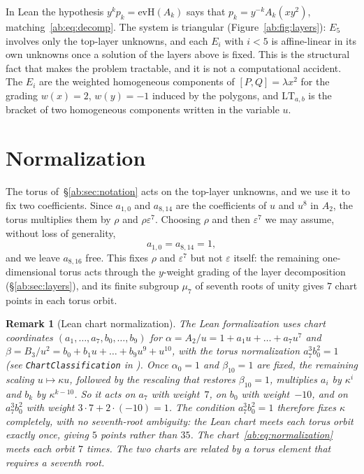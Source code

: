 \documentclass[a4paper,11pt]{article}
\newcommand{\filename}[1]{\texttt{\seqsplit{#1}}}
\theoremstyle{jsplain}
\theoremstyle{jsdef}
\theoremstyle{jsrem}
\newtheorem{remark}[theorem]{Remark}
\begin{document}
In Lean the hypothesis $y^k p_k=\mathrm{evH}(A_k)$ says that $p_k=y^{-k}A_k(xy^2)$, matching~\eqref{ab:eq:decomp}. The system is triangular (Figure~\ref{ab:fig:layers}): $E_5$ involves only the top-layer unknowns, and each $E_i$ with $i<5$ is affine-linear in its own unknowns once a solution of the layers above is fixed. This is the structural fact that makes the problem tractable, and it is not a computational accident. The $E_i$ are the weighted homogeneous components of $[P,Q]=\lambda x^2$ for the grading $w(x)=2$, $w(y)=-1$ induced by the polygons, and $\mathrm{LT}_{a,b}$ is the bracket of two homogeneous components written in the variable $u$.

\section{Normalization}\label{ab:sec:normalization}

The torus of~\S\ref{ab:sec:notation} acts on the top-layer unknowns, and we use it to fix two coefficients. Since $a_{1,0}$ and $a_{8,14}$ are the coefficients of $u$ and $u^8$ in $A_2$, the torus multiplies them by $\rho$ and $\rho\varepsilon^7$. Choosing $\rho$ and then $\varepsilon^7$ we may assume, without loss of generality,
\begin{equation}\label{ab:eq:normalization}
a_{1,0}=a_{8,14}=1,
\end{equation}
and we leave $a_{8,16}$ free. This fixes $\rho$ and $\varepsilon^7$ but not $\varepsilon$ itself: the remaining one-dimensional torus acts through the $y$-weight grading of the layer decomposition (\S\ref{ab:sec:layers}), and its finite subgroup $\mu_7$ of seventh roots of unity gives $7$ chart points in each torus orbit.

\begin{remark}[Lean chart normalization]
The Lean formalization uses chart coordinates $(a_1,\dots,a_7,b_0,\dots,b_9)$ for $\alpha=A_2/u=1+a_1u+\dots+a_7u^7$ and $\beta=B_3/u^2=b_0+b_1u+\dots+b_9u^9+u^{10}$, with the torus normalization $a_7^3 b_0^2 = 1$ (see \texttt{ChartClassification} in \filename{Jacobian/BranchAbChart.lean}). Once $\alpha_0=1$ and $\beta_{10}=1$ are fixed, the remaining scaling $u\mapsto\kappa u$, followed by the rescaling that restores $\beta_{10}=1$, multiplies $a_i$ by $\kappa^i$ and $b_k$ by $\kappa^{k-10}$. So it acts on $a_7$ with weight~$7$, on $b_0$ with weight~$-10$, and on $a_7^3 b_0^2$ with weight $3\cdot7+2\cdot(-10)=1$. The condition $a_7^3 b_0^2 = 1$ therefore fixes $\kappa$ completely, with no seventh-root ambiguity: the Lean chart meets each torus orbit exactly once, giving $5$ points rather than $35$. The chart~\eqref{ab:eq:normalization} meets each orbit $7$ times. The two charts are related by a torus element that requires a seventh root.
\end{remark}
\end{document}
